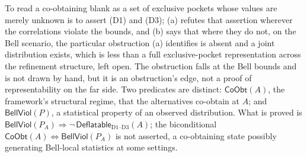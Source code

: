 \documentclass[11pt]{article}
\begin{document}
\noindent To read a co-obtaining blank as a set of exclusive pockets whose values are merely unknown is to assert (D1) and (D3); (a) refutes that assertion wherever the correlations violate the bounds, and (b) says that where they do not, on the Bell scenario, the particular obstruction (a) identifies is absent and a joint distribution exists, which is less than a full exclusive-pocket representation across the refinement structure, left open. The obstruction falls at the Bell bounds and is not drawn by hand, but it is an obstruction's edge, not a proof of representability on the far side. Two predicates are distinct: $\mathsf{CoObt}(A)$, the framework's structural regime, that the alternatives co-obtain at $A$; and $\mathsf{BellViol}(P)$, a statistical property of an observed distribution. What is proved is $\mathsf{BellViol}(P_A) \Rightarrow \neg\,\mathsf{Deflatable}_{\mathrm{D1\text{--}D3}}(A)$; the biconditional $\mathsf{CoObt}(A) \iff \mathsf{BellViol}(P_A)$ is not asserted, a co-obtaining state possibly generating Bell-local statistics at some settings.
\end{document}
